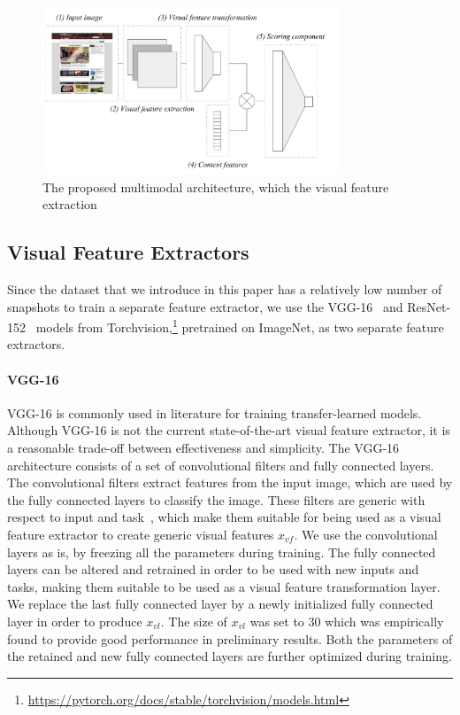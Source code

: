 

\begin{figure}[t]
\includegraphics[width = 3.5in]{images/multimodelarchitecture.pdf}
\caption{The proposed multimodal architecture, which the visual feature extraction}
\label{fig:multimodelarchitecture}
\end{figure}

\subsection{Visual Feature Extractors}
Since the \datasetname{} data\-set that we introduce in this paper has a relatively low number of snapshots to train a separate feature extractor, we use the VGG-16~\cite{simonyan2014very} and ResNet-152~\cite{he2016deep} models from Torchvision,\footnote{\url{https://pytorch.org/docs/stable/torchvision/models.html}} pretrained on ImageNet, as two separate feature extractors. 
\paragraph{VGG-16}
VGG-16 is commonly used in literature for training transfer-learned models. 
Although VGG-16 is not the current state-of-the-art visual feature extractor, it is a reasonable trade-off between effectiveness and simplicity.
The VGG-16 architecture consists of a set of convolutional filters and fully connected layers. 
The convolutional filters extract features from the input image, which are used by the fully connected layers to classify the image. 
These filters are generic with respect to input and task~\citep{donahue2014decaf}, which make them suitable for being used as a visual feature extractor to create generic visual features $x_{vf}$. We use the convolutional layers as is, by freezing all the parameters during training. The fully connected layers can be altered and retrained in order to be used with new inputs and tasks, making them suitable to be used as a visual feature transformation layer. We replace the last fully connected layer by a newly initialized fully connected layer in order to produce $x_{vl}$. The size of $x_{vl}$ was set to $30$ which was empirically found to provide good performance in preliminary results. Both the parameters of the retained and new fully connected layers are further optimized during training.

